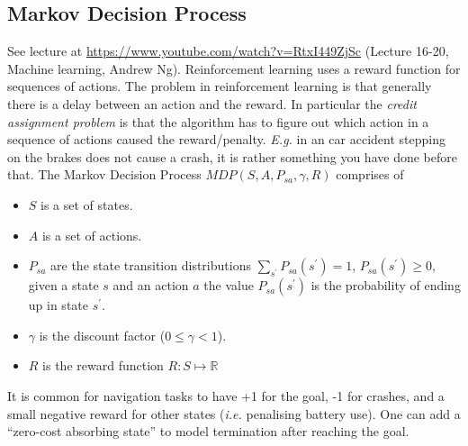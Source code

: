 \documentclass{article}
\begin{document}
\subsection{Markov Decision Process}
See lecture at \url{https://www.youtube.com/watch?v=RtxI449ZjSc} (Lecture 16-20, Machine learning, Andrew Ng).
Reinforcement learning uses a reward function for sequences of actions.
The problem in reinforcement learning is that generally there is a delay between an action and the reward.
In particular the \emph{credit assignment problem} is that the algorithm has to figure out
which action in a sequence of actions caused the reward/penalty.
\emph{E.g.} in an car accident stepping on the brakes does not cause a crash, it is rather something you have done before that.
The Markov Decision Process $MDP(S,A,P_{sa},\gamma,R)$ comprises of
\begin{itemize}
  \item $S$ is a set of states.
  \item $A$ is a set of actions.
  \item $P_{sa}$ are the state transition distributions $\sum_{s^\prime} P_{sa}(s^\prime)=1$, $P_{sa}(s^\prime)\ge 0$,
    given a state $s$ and an action $a$ the value $P_{sa}(s^\prime)$ is the probability of ending up in state $s^\prime$.
  \item $\gamma$ is the discount factor ($0 \le \gamma < 1$).
  \item $R$ is the reward function $R : S \mapsto \mathbb{R}$
\end{itemize}
It is common for navigation tasks to have +1 for the goal, -1 for crashes,
and a small negative reward for other states (\emph{i.e.} penalising battery use).
One can add a ``zero-cost absorbing state'' to model termination after reaching the goal.
\end{document}
